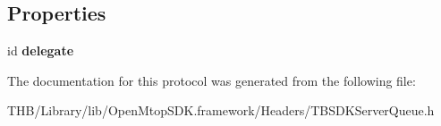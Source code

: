 \subsection*{Properties}
\begin{DoxyCompactItemize}
\item 
\mbox{\label{protocol_t_b_s_d_k_request_queue_protocol_01-p_aabba9b52c63e9299fa55003a1393722b}} 
id {\bfseries delegate}
\end{DoxyCompactItemize}


The documentation for this protocol was generated from the following file\+:\begin{DoxyCompactItemize}
\item 
T\+H\+B/\+Library/lib/\+Open\+Mtop\+S\+D\+K.\+framework/\+Headers/T\+B\+S\+D\+K\+Server\+Queue.\+h\end{DoxyCompactItemize}
